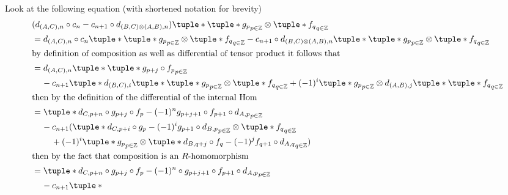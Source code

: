 \begin{remark}
\begin{enumerate}
{            Look at the following equation (with shortened notation for brevity) 
            \begin{align*}
                &( d_{(A, C), n} \circ c_n - c_{n + 1} \circ d_{(B, C) \otimes (A, B), n} )\tuple*{ \tuple*{ g_p }_{p \in \Zb} \otimes \tuple*{ f_q }_{q \in \Zb} } \\
                &= d_{(A, C), n} \circ c_n \tuple*{ \tuple*{ g_p }_{p \in \Zb} \otimes \tuple*{ f_q }_{q \in \Zb} } - c_{n + 1} \circ d_{(B, C) \otimes (A, B), n}\tuple*{ \tuple*{ g_p }_{p \in \Zb} \otimes \tuple*{ f_q }_{q \in \Zb} } \\
                \intertext{by definition of composition as well as differential of tensor product it follows that}
                &= d_{(A, C), n}\tuple*{
                    \tuple*{ g_{p + j} \circ f_p }_{p \in \Zb}
                } \\
                &\hspace{0.4cm} - c_{n + 1} \tuple*{
                    d_{(B, C), i}\tuple*{ \tuple*{ g_p }_{p \in \Zb} } \otimes \tuple*{ f_q }_{q \in \Zb}
                    + (-1)^i \tuple*{ g_p }_{p \in \Zb} \otimes d_{(A, B), j} \tuple*{ \tuple*{ f_q }_{q \in \Zb} }
                } \\
                \intertext{then by the definition of the differential of the internal Hom}
                &= \tuple*{
                    d_{C, p + n} \circ g_{p + j} \circ f_p - (-1)^n g_{p + j + 1} \circ f_{p + 1} \circ d_{A, p}
                }_{p \in \Zb} \\
                &\hspace{0.4cm} - c_{n + 1} (
                    \tuple*{
                        d_{C, p + i} \circ g_p - (-1)^i g_{p + 1} \circ d_{B, p}
                    }_{p \in \Zb} \otimes \tuple*{ f_q }_{q \in \Zb} \\
                    &\hspace{0.8cm}+ (-1)^i \tuple*{ g_p }_{p \in \Zb} \otimes \tuple*{
                        d_{B, q + j} \circ f_q - (-1)^j f_{q + 1} \circ d_{A, q}
                    }_{q \in \Zb}
                ) \\
                \intertext{then by the fact that composition is an \( R \)-homomorphism}
                &= \tuple*{
                    d_{C, p + n} \circ g_{p + j} \circ f_p - (-1)^n \circ g_{p + j + 1} \circ f_{p + 1} \circ d_{A, p}
                }_{p \in \Zb} \\
                &\hspace{0.4cm} - c_{n + 1} \tuple*{
}
\end{align*}}
\end{enumerate}
\end{remark}
